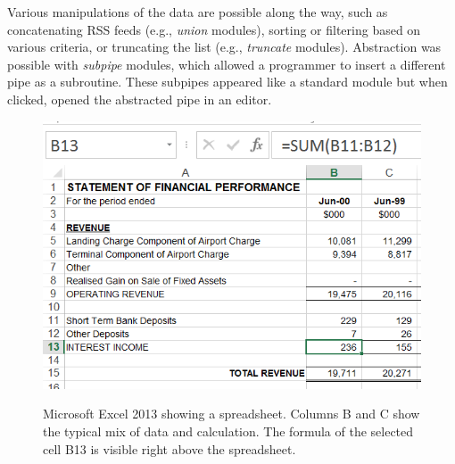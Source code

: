 \documentclass{sig-alternate}
\begin{document}
Various manipulations of the data are possible along the  way, such as concatenating RSS feeds (e.g., \emph{union} modules), sorting  or filtering based on various criteria, or truncating the list (e.g., \emph{truncate} modules). 
Abstraction was possible with \emph{subpipe} modules, which allowed a programmer to insert a different pipe as a subroutine. These subpipes appeared like a standard module but when clicked, opened the abstracted pipe in an editor. 


\begin{figure}[htb]
\caption{Microsoft Excel 2013 showing a spreadsheet. Columns B and C show the typical mix of data and calculation. The formula of the selected cell B13 is visible right above the spreadsheet.}
\centering
\includegraphics[width=\columnwidth]{img/excel-2}
\label{fig:spreadsheetexample}
\end{figure}
\end{document}
